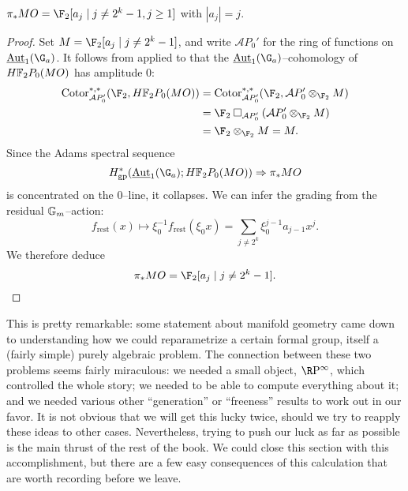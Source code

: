 \begin{corollary}\label{CalculationOfPiStarMO}
\(\pi_* MO = \F_2[a_j \mid j \ne 2^k - 1, j \ge 1]\) with \(|a_j| = j\).
\end{corollary}
\begin{proof}
Set \(M = \F_2[a_j \mid j \ne 2^k - 1]\), and write \(\mathcal AP_0'\) for the ring of functions on \(\InternalAut_1(\G_a)\).  It follows from  applied to  that the \(\InternalAut_1(\G_a)\)--cohomology of \(\HFtwo P_0(MO)\) has amplitude \(0\):
\begin{align*}
\Cotor_{\mathcal AP_0'}^{*, *}(\F_2, \HFtwo P_0(MO)) & = \Cotor_{\mathcal AP_0'}^{*, *}(\F_2, \mathcal AP_0' \otimes_{\F_2} M) \\
& = \F_2 \cotensor_{\mathcal AP_0'} (\mathcal AP_0' \otimes_{\F_2} M) \\
& = \F_2 \otimes_{\F_2} M = M.
\end{align*}
Since the Adams spectral sequence \[H^*_{\mathrm{gp}}(\InternalAut_1(\G_a); \HFtwo P_0(MO)) \Rightarrow \pi_* MO\] is concentrated on the \(0\)--line, it collapses.  We can infer the grading from the residual \(\mathbb G_m\)--action: \[f_{\mathrm{rest}}(x) \mapsto \xi_0^{-1} f_{\mathrm{rest}}(\xi_0 x) = \sum_{j \ne 2^k} \xi_0^{j-1} a_{j-1} x^j.\]  We therefore deduce \[\pi_* MO = \F_2[a_j \mid j \ne 2^k-1]. \qedhere\]
\end{proof}

This is pretty remarkable: some statement about manifold geometry came down to understanding how we could reparametrize a certain formal group, itself a (fairly simple) purely algebraic problem.  The connection between these two problems seems fairly miraculous: we needed a small object, \(\RP^\infty\), which controlled the whole story; we needed to be able to compute everything about it; and we needed various other ``generation'' or ``freeness'' results to work out in our favor.  It is not obvious that we will get this lucky twice, should we try to reapply these ideas to other cases.  Nevertheless, trying to push our luck as far as possible is the main thrust of the rest of the book.  We could close this section with this accomplishment, but there are a few easy consequences of this calculation that are worth recording before we leave.


